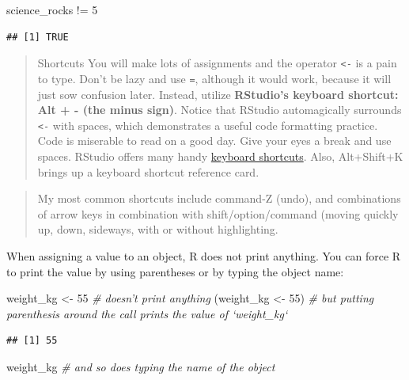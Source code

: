 \documentclass[]{book}
\newenvironment{Shaded}{\begin{snugshade}}{\end{snugshade}}
\newcommand{\DecValTok}[1]{\textcolor[rgb]{0.00,0.00,0.81}{{#1}}}
\newcommand{\StringTok}[1]{\textcolor[rgb]{0.31,0.60,0.02}{{#1}}}
\newcommand{\CommentTok}[1]{\textcolor[rgb]{0.56,0.35,0.01}{\textit{{#1}}}}
\newcommand{\NormalTok}[1]{{#1}}
\theoremstyle{definition}
\theoremstyle{definition}
\theoremstyle{definition}
\theoremstyle{remark}
\begin{document}
\begin{Shaded}
\begin{Highlighting}[]
\NormalTok{science_rocks !=}\StringTok{ }\DecValTok{5}
\end{Highlighting}
\end{Shaded}

\begin{verbatim}
## [1] TRUE
\end{verbatim}

\begin{quote}
Shortcuts You will make lots of assignments and the operator
\texttt{\textless{}-} is a pain to type. Don't be lazy and use
\texttt{=}, although it would work, because it will just sow confusion
later. Instead, utilize \textbf{RStudio's keyboard shortcut: Alt + -
(the minus sign)}. Notice that RStudio automagically surrounds
\texttt{\textless{}-} with spaces, which demonstrates a useful code
formatting practice. Code is miserable to read on a good day. Give your
eyes a break and use spaces. RStudio offers many handy
\href{https://support.rstudio.com/hc/en-us/articles/200711853-Keyboard-Shortcuts}{keyboard
shortcuts}. Also, Alt+Shift+K brings up a keyboard shortcut reference
card.
\end{quote}

\begin{quote}
My most common shortcuts include command-Z (undo), and combinations of
arrow keys in combination with shift/option/command (moving quickly up,
down, sideways, with or without highlighting.
\end{quote}

When assigning a value to an object, R does not print anything. You can
force R to print the value by using parentheses or by typing the object
name:

\begin{Shaded}
\begin{Highlighting}[]
\NormalTok{weight_kg <-}\StringTok{ }\DecValTok{55}    \CommentTok{# doesn't print anything}
\NormalTok{(weight_kg <-}\StringTok{ }\DecValTok{55}\NormalTok{)  }\CommentTok{# but putting parenthesis around the call prints the value of `weight_kg`}
\end{Highlighting}
\end{Shaded}

\begin{verbatim}
## [1] 55
\end{verbatim}

\begin{Shaded}
\begin{Highlighting}[]
\NormalTok{weight_kg          }\CommentTok{# and so does typing the name of the object}
\end{Highlighting}
\end{Shaded}
\end{document}
